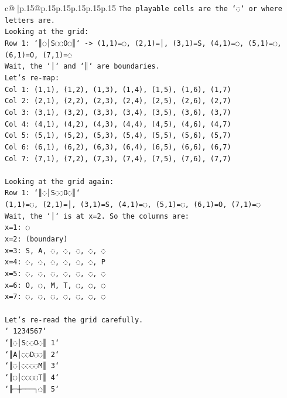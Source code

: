 \documentclass{article}
\begin{document}
{\begin{supertabular}{c@{$\;$}|p{.15\linewidth}@{}p{.15\linewidth}p{.15\linewidth}p{.15\linewidth}p{.15\linewidth}p{.15\linewidth}}
{{{\texttt{The playable cells are the `◌` or where letters are.} \\
\texttt{Looking at the grid:} \\
\texttt{Row 1: `║◌│S◌◌O◌║` {-}> (1,1)=◌, (2,1)=│, (3,1)=S, (4,1)=◌, (5,1)=◌, (6,1)=O, (7,1)=◌} \\
\texttt{Wait, the `│` and `║` are boundaries.} \\
\texttt{Let's re{-}map:} \\
\texttt{Col 1: (1,1), (1,2), (1,3), (1,4), (1,5), (1,6), (1,7)} \\
\texttt{Col 2: (2,1), (2,2), (2,3), (2,4), (2,5), (2,6), (2,7)} \\
\texttt{Col 3: (3,1), (3,2), (3,3), (3,4), (3,5), (3,6), (3,7)} \\
\texttt{Col 4: (4,1), (4,2), (4,3), (4,4), (4,5), (4,6), (4,7)} \\
\texttt{Col 5: (5,1), (5,2), (5,3), (5,4), (5,5), (5,6), (5,7)} \\
\texttt{Col 6: (6,1), (6,2), (6,3), (6,4), (6,5), (6,6), (6,7)} \\
\texttt{Col 7: (7,1), (7,2), (7,3), (7,4), (7,5), (7,6), (7,7)} \\
\\ 
\texttt{Looking at the grid again:} \\
\texttt{Row 1: `║◌│S◌◌O◌║`} \\
\texttt{(1,1)=◌, (2,1)=│, (3,1)=S, (4,1)=◌, (5,1)=◌, (6,1)=O, (7,1)=◌} \\
\texttt{Wait, the `│` is at x=2. So the columns are:} \\
\texttt{x=1: ◌} \\
\texttt{x=2: (boundary)} \\
\texttt{x=3: S, A, ◌, ◌, ◌, ◌, ◌} \\
\texttt{x=4: ◌, ◌, ◌, ◌, ◌, ◌, P} \\
\texttt{x=5: ◌, ◌, ◌, ◌, ◌, ◌, ◌} \\
\texttt{x=6: O, ◌, M, T, ◌, ◌, ◌} \\
\texttt{x=7: ◌, ◌, ◌, ◌, ◌, ◌, ◌} \\
\\ 
\texttt{Let's re{-}read the grid carefully.} \\
\texttt{` 1234567`} \\
\texttt{`║◌│S◌◌O◌║ 1`} \\
\texttt{`║A│◌◌D◌◌║ 2`} \\
\texttt{`║◌│◌◌◌◌M║ 3`} \\
\texttt{`║◌│◌◌◌◌T║ 4`} \\
\texttt{`╟─┼───┐◌║ 5`} \\
}}}
\end{supertabular}}
\end{document}
